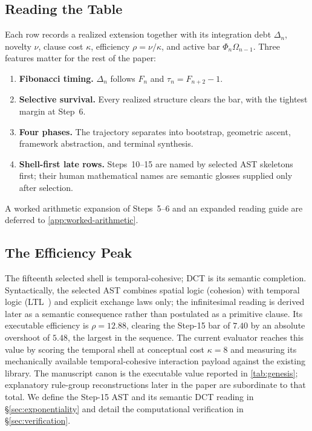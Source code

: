 \documentclass[11pt,a4paper]{article}
\theoremstyle{plain}
\theoremstyle{definition}
\theoremstyle{remark}
\begin{document}
\subsection{Reading the Table}

Each row records a realized extension together with its integration debt $\Delta_n$, novelty $\nu$, clause cost $\kappa$, efficiency $\rho=\nu/\kappa$, and active bar $\Phi_n\Omega_{n-1}$.
Three features matter for the rest of the paper:
\begin{enumerate}[nosep]
    \item \textbf{Fibonacci timing.} $\Delta_n$ follows $F_n$ and $\tau_n=F_{n+2}-1$.
    \item \textbf{Selective survival.} Every realized structure clears the bar, with the tightest margin at Step~6.
    \item \textbf{Four phases.} The trajectory separates into bootstrap, geometric ascent, framework abstraction, and terminal synthesis.
    \item \textbf{Shell-first late rows.} Steps~10--15 are named by selected AST skeletons first; their human mathematical names are semantic glosses supplied only after selection.
\end{enumerate}
A worked arithmetic expansion of Steps~5--6 and an expanded reading guide are deferred to \cref{app:worked-arithmetic}.

\subsection{The Efficiency Peak}

The fifteenth selected shell is temporal-cohesive; DCT is its semantic completion.
Syntactically, the selected AST combines spatial logic (cohesion) with temporal logic (LTL~\cite{nakano}) and explicit exchange laws only; the infinitesimal reading is derived later as a semantic consequence rather than postulated as a primitive clause.
Its executable efficiency is $\rho = 12.88$, clearing the Step-15 bar of $7.40$ by an absolute overshoot of $5.48$, the largest in the sequence.
The current evaluator reaches this value by scoring the temporal shell at conceptual cost $\kappa = 8$ and measuring its mechanically available temporal-cohesive interaction payload against the existing library.
The manuscript canon is the executable value reported in \cref{tab:genesis}; explanatory rule-group reconstructions later in the paper are subordinate to that total.
We define the Step-15 AST and its semantic DCT reading in \S\ref{sec:exponentiality} and detail the computational verification in \S\ref{sec:verification}.
\end{document}
